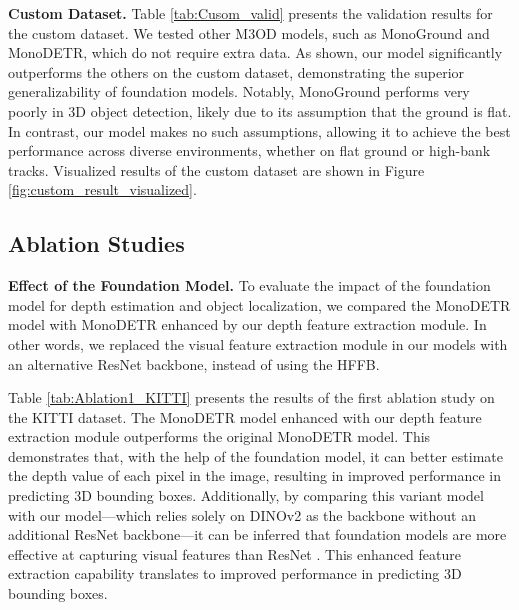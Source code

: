 \textbf{Custom Dataset.} Table \ref{tab:Cusom_valid} presents the validation results for the custom dataset.
We tested other M3OD models, such as MonoGround and MonoDETR, which do not require extra data.
As shown, our model significantly outperforms the others on the custom dataset, demonstrating the superior generalizability of foundation models.
Notably, MonoGround performs very poorly in 3D object detection, likely due to its assumption that the ground is flat.
In contrast, our model makes no such assumptions, allowing it to achieve the best performance across diverse environments, whether on flat ground or high-bank tracks. Visualized results of the custom dataset are shown in Figure \ref{fig:custom_result_visualized}.

\subsection{Ablation Studies}
\textbf{Effect of the Foundation Model.}
To evaluate the impact of the foundation model for depth estimation and object localization, we compared the MonoDETR model with MonoDETR enhanced by our depth feature extraction module.
In other words, we replaced the visual feature extraction module in our models with an alternative ResNet backbone, instead of using the HFFB.

Table \ref{tab:Ablation1_KITTI} presents the results of the first ablation study on the KITTI dataset. The MonoDETR model enhanced with our depth feature extraction module outperforms the original MonoDETR model. This demonstrates that, with the help of the foundation model, it can better estimate the depth value of each pixel in the image, resulting in improved performance in predicting 3D bounding boxes.
Additionally, by comparing this variant model with our model—which relies solely on DINOv2 as the backbone without an additional ResNet backbone—it can be inferred that foundation models are more effective at capturing visual features than ResNet \cite{he2016deep}. This enhanced feature extraction capability translates to improved performance in predicting 3D bounding boxes.

